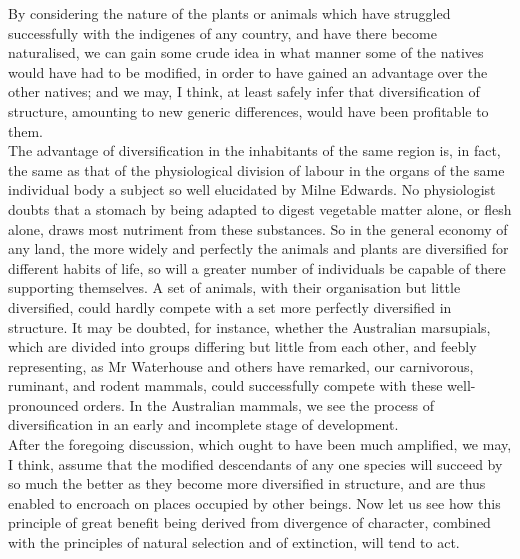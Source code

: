 \indent By considering the nature of the plants or animals which have struggled successfully with the indigenes of any country, and have there become naturalised, we can gain some crude idea in what manner some of the natives would have had to be modified, in order to have gained an advantage over the other natives; and we may, I think, at least safely infer that diversification of structure, amounting to new generic differences, would have been profitable to them. \\
\indent The advantage of diversification in the inhabitants of the same region is, in fact, the same as that of the physiological division of labour in the organs of the same individual body a subject so well elucidated by Milne Edwards. No physiologist doubts that a stomach by being adapted to digest vegetable matter alone, or flesh alone, draws most nutriment from these substances. So in the general economy of any land, the more widely and perfectly the animals and plants are diversified for different habits of life, so will a greater number of individuals be capable of there supporting themselves. A set of animals, with their organisation but little diversified, could hardly compete with a set more perfectly diversified in structure. It may be doubted, for instance, whether the Australian marsupials, which are divided into groups differing but little from each other, and feebly representing, as Mr Waterhouse and others have remarked, our carnivorous, ruminant, and rodent mammals, could successfully compete with these well-pronounced orders. In the Australian mammals, we see the process of diversification in an early and incomplete stage of development. \\
\indent After the foregoing discussion, which ought to have been much amplified, we may, I think, assume that the modified descendants of any one species will succeed by so much the better as they become more diversified in structure, and are thus enabled to encroach on places occupied by other beings.  Now let us see how this principle of great benefit being derived from divergence of character, combined with the principles of natural selection and of extinction, will tend to act. \\
